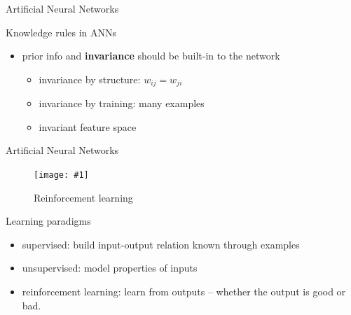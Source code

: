 \documentclass[9pt,t]{beamer}
\newcommand{\picHereWidth}[4] { %
    \begin{figure}[htp] %
        \centering
        \texttt{[image: \#1]} %
        \caption{#2} %
        \label{#3}
    \end{figure} %
}
\begin{document}
\begin{frame}{Artificial Neural Networks}
\begin{alertblock}{Knowledge rules in ANNs}
\begin{itemize}
            \item prior info and \textbf{invariance} should be built-in to the network
            \begin{itemize}
                \item invariance by structure: $w_{ij} = w_{ji}$
                \item invariance by training: many examples
                \item invariant feature space
            \end{itemize}
        \end{itemize}
    \end{alertblock}
\end{frame}

\begin{frame}{Artificial Neural Networks}
    \picHereWidth{reinforce_learn.png}{Reinforcement learning}{fig:rf}{0.5\linewidth}
    \begin{alertblock}{Learning paradigms}
        \begin{itemize}
            \item supervised: build input-output relation known through examples
            \item unsupervised: model properties of inputs
            \item reinforcement learning: learn from outputs -- whether the output is good or bad.
        \end{itemize}
    \end{alertblock}
\end{frame}
\end{document}
